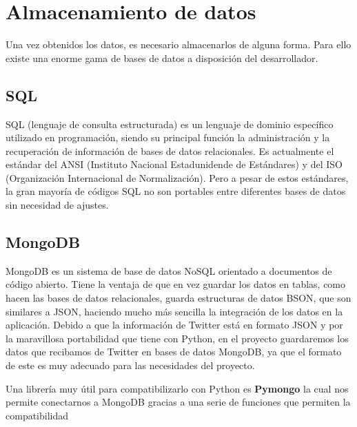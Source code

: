 \section{Almacenamiento de datos}
Una vez obtenidos los datos, es necesario almacenarlos de alguna forma. Para ello existe una enorme gama de bases de datos a disposición del desarrollador. 

\subsection{SQL}

SQL (lenguaje de consulta estructurada) es un lenguaje de dominio específico utilizado en programación, siendo su principal función la administración y la recuperación de información de bases de datos relacionales. Es actualmente el estándar del ANSI (Instituto Nacional Estadunidende de Estándares) y del ISO (Organización Internacional de Normalización). Pero a pesar de estos estándares, la gran mayoría de códigos SQL no son portables entre diferentes bases de datos sin necesidad de ajustes. 

\subsection{MongoDB}

MongoDB es un sistema de base de datos NoSQL orientado a documentos de código abierto. Tiene la ventaja de que en vez guardar los datos en tablas, como hacen las bases de datos relacionales, guarda estructuras de datos BSON, que son similares a JSON, haciendo mucho más sencilla la integración de los datos en la aplicación. Debido a que la información de Twitter está en formato JSON y por la maravillosa portabilidad que tiene con Python, en el proyecto guardaremos los datos que recibamos de Twitter en bases de datos MongoDB, ya que el formato de este es muy adecuado para las necesidades del proyecto. 

Una librería muy útil para compatibilizarlo con Python es \textbf{Pymongo} la cual nos permite conectarnos a MongoDB gracias a una serie de funciones que permiten la compatibilidad
  



 
